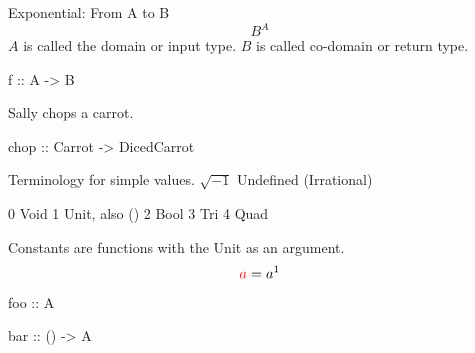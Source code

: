 \documentclass{beamer}
\begin{document}
\begin{frame}[fragile]
Exponential: From A to B\newline\newline
$$ B^{A} $$
$A$ is called the domain or input type. $B$ is called co-domain or return type.
\begin{code}
f :: A -> B
\end{code}

Sally chops a carrot.
\begin{code}
chop :: Carrot -> DicedCarrot
\end{code}

\end{frame}


%







\begin{frame}[fragile]
Terminology for simple values.\newline\newline
$\sqrt{-1}$ Undefined (Irrational)
\begin{ccode}
0 Void
1 Unit, also ()
2 Bool 
3 Tri
4 Quad
\end{ccode}
\end{frame}

\begin{frame}[fragile]
Constants are functions with the Unit as an argument.
$$\textcolor{red}{a} = a^{1} $$
\color{red}
\begin{code}
foo ::  A
\end{code}
\color{black}
\begin{code}
bar :: () -> A
\end{code}
\end{frame}
\end{document}
